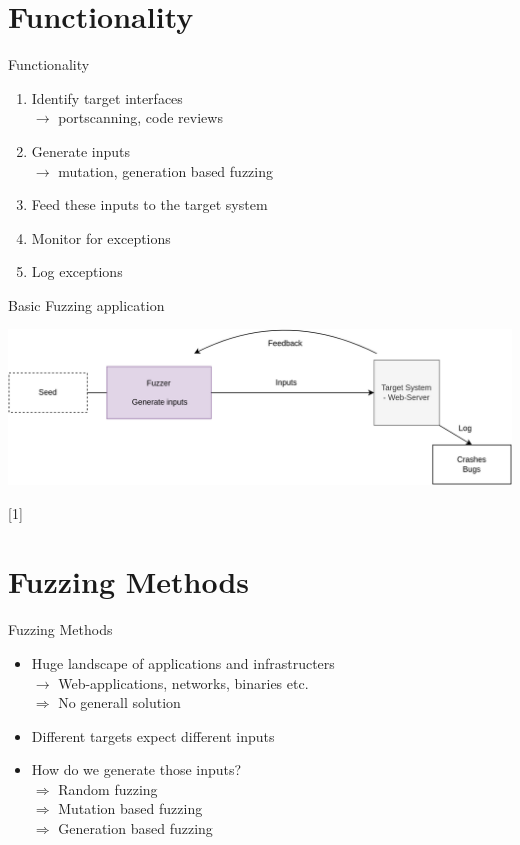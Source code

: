 \documentclass{beamer}
\begin{document}
\section{Functionality}
\begin{frame}{Functionality}
\begin{enumerate}
 \item Identify target interfaces\\
 $\rightarrow$ portscanning, code reviews
 \item Generate inputs\\
 $\rightarrow$ mutation, generation based fuzzing
 \item Feed these inputs to the target system
 \item Monitor for exceptions
 \item Log exceptions
\end{enumerate}

\end{frame}
\begin{frame}{Basic Fuzzing application}
\vspace{15mm}
\begin{center}
  \includegraphics[scale=0.15]{basicfuzz.png}
\end{center}
\vspace{15mm}
\small{[1]}
\end{frame}
\section{Fuzzing Methods}
\begin{frame}{Fuzzing Methods}
 \begin{itemize}
  \item Huge landscape of applications and infrastructers\\
  $\rightarrow$ Web-applications, networks, binaries etc.\\
  $\Rightarrow$ No generall solution
  \item Different targets expect different inputs
  \item How do we generate those inputs?\\
  $\Rightarrow$ Random fuzzing\\
  $\Rightarrow$ Mutation based fuzzing\\
  $\Rightarrow$ Generation based fuzzing
 \end{itemize}

\end{frame}
\end{document}
